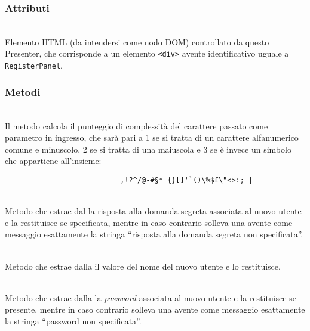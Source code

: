 \subsubsection*{Attributi}
\begin{description}
  \item{}\\
  Elemento HTML (da intendersi come nodo DOM) controllato da questo Presenter, che corrisponde a un elemento \verb'<div>' avente identificativo uguale a \verb'RegisterPanel'.
\end{description}

\subsubsection*{Metodi}
\begin{description}
	\item{}\\
	Il metodo calcola il punteggio di complessità del carattere passato come parametro in ingresso, che sarà pari a 1 se si tratta di un carattere alfanumerico comune e minuscolo, 2 se si tratta di una maiuscola e 3 se è invece un simbolo che appartiene all'insieme:
\begin{verbatim}
	                       ,!?^/@-#§* {}[]'`()\%$£\"<>:;_|
\end{verbatim}
	
	\item{}\\
	Metodo che estrae dal  la risposta alla domanda segreta associata al nuovo utente e la restituisce se specificata, mentre in caso contrario solleva una  avente come messaggio esattamente la stringa ``risposta alla domanda segreta non specificata''.
	
	\item{}\\
	Metodo che estrae dalla  il valore del nome del nuovo utente e lo restituisce.
	
		\item{}\\
	Metodo che estrae dalla  la \textit{password} associata al nuovo utente e la restituisce se presente, mentre in caso contrario solleva una  avente come messaggio esattamente la stringa ``password non specificata''.
	

\end{description}
